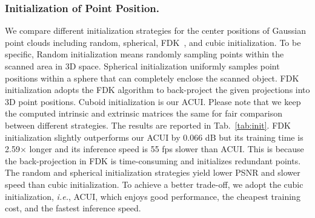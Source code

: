 \documentclass[runningheads]{llncs}
\begin{document}
\vspace{-4mm}
\subsubsection{Initialization of Point Position.} 
We compare different initialization strategies for the center positions of Gaussian point clouds including random, spherical, FDK~\cite{fdk}, and cubic initialization. To be specific, Random initialization means randomly sampling points within the scanned area in 3D space. Spherical initialization uniformly samples point positions within a sphere that can completely enclose the scanned object. FDK~\cite{fdk} initialization adopts the FDK algorithm to back-project the given projections into 3D point positions. Cuboid initialization is our ACUI. Please note that we keep the computed intrinsic and extrinsic matrices the same for fair comparison between different strategies. The results are reported in Tab.~\ref{tab:init}. FDK initialization slightly outperforms our ACUI by 0.066 dB but its training time is 2.59$\times$ longer and its inference speed is 55 fps slower than ACUI. This is because the back-projection in FDK is time-consuming and initializes redundant points. The random and spherical initialization strategies yield lower PSNR and slower speed than cubic initialization.  To achieve a better trade-off, we adopt the cubic initialization, \emph{i.e.}, ACUI, which enjoys good performance, the cheapest training cost, and the fastest inference speed.
\end{document}
